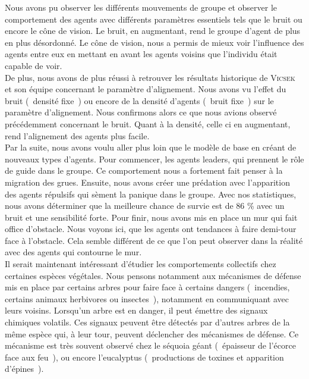 \documentclass[french, a4paper, 12pt, openany]{report}
\begin{document}
    Nous avons pu observer les différents mouvements de groupe et observer le comportement des agents avec différents paramètres essentiels tels que le bruit ou encore le cône de vision. Le bruit, en augmentant, rend le groupe d'agent de plus en plus désordonné. Le cône de vision, nous a permis de mieux voir l'influence des agents entre eux en mettant en avant les agents voisins que l'individu était capable de voir.\\
    
    De plus, nous avons de plus réussi à retrouver les résultats historique de \textsc{Vicsek} et son équipe concernant le paramètre d'alignement. Nous avons vu l'effet du bruit (~densité fixe~) ou encore de la densité d'agents (~bruit fixe~) sur le paramètre d'alignement. Nous confirmons alors ce que nous avions observé précédemment concernant le bruit. Quant à la densité, celle ci en augmentant, rend l'alignement des agents plus facile. \\
    
    Par la suite, nous avons voulu aller plus loin que le modèle de base en créant de nouveaux types d'agents. Pour commencer, les agents leaders, qui prennent le rôle de guide dans le groupe. Ce comportement nous a fortement fait penser à la migration des grues. 
    Ensuite, nous avons créer une prédation avec l'apparition des agents répulsifs qui sèment la panique dans le groupe. Avec nos statistiques, nous avons déterminer que la meilleure chance de survie est de 86 \% avec un bruit et une sensibilité forte. 
    Pour finir, nous avons mis en place un mur qui fait office d'obstacle. Nous voyons ici, que les agents ont tendances à faire demi-tour face à l'obstacle. Cela semble différent de ce que l'on peut observer dans la réalité avec des agents qui contourne le mur.\\
    
    Il serait maintenant intéressant d'étudier les comportements collectifs chez certaines espèces végétales. Nous pensons notamment aux mécanismes de défense mis en place par certains arbres pour faire face à certains dangers (~incendies, certains animaux herbivores ou insectes~), notamment en communiquant avec leurs voisins. Lorsqu'un arbre est en danger, il peut émettre des signaux chimiques volatils. Ces signaux peuvent être détectés par d'autres arbres de la même espèce qui, à leur tour, peuvent déclencher des mécanismes de défense. Ce mécanisme est très souvent observé chez le séquoia géant (~épaisseur de l'écorce face aux feu~), ou encore l'eucalyptus (~productions de toxines et apparition d'épines~). 
\end{document}
